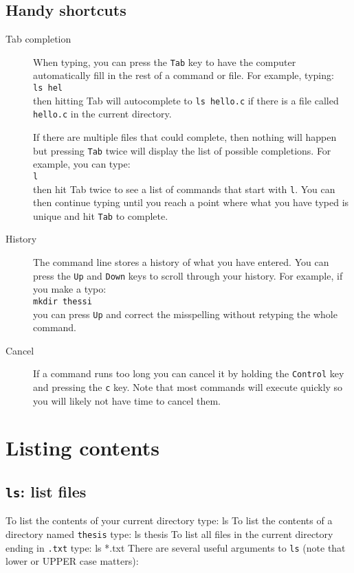 \documentclass[12pt]{article}
\newenvironment{cmd}{\verbatim}{\endverbatim\vspace{5pt}}
\begin{document}
\subsection*{Handy shortcuts}
\begin{description}
\item[Tab completion]
When typing, you can press the \texttt{Tab} key to have the computer automatically fill in the rest of a command or file. For example, typing:\\
\texttt{ls hel}\\
then hitting Tab will autocomplete to \texttt{ls hello.c} if there is a file called \texttt{hello.c} in the current directory. 
 
If there are multiple files that could complete, then nothing will happen but pressing \texttt{Tab} twice will display the list of possible completions. For example, you can type:\\
\texttt{l}\\
then hit Tab twice to see a list of commands that start with \texttt{l}. You can then continue typing until you reach a point where what you have typed is unique and hit \texttt{Tab} to complete.
\item[History]
The command line stores a history of what you have entered. You can press the \texttt{Up} and \texttt{Down} keys to scroll through your history. For example, if you make a typo:\\
\texttt{mkdir thessi}\\
you can press \texttt{Up} and correct the misspelling without retyping the whole command.\
\item[Cancel] If a command runs too long you can cancel it by holding the \texttt{Control} key and pressing the \texttt{c} key. Note that most commands will execute quickly so you will likely not have time to cancel them.

\end{description}


\section*{Listing contents}
\subsection*{\texttt{ls}: list files}
To list the contents of your current directory type:
\begin{cmd}
  ls
\end{cmd}
To list the contents of a directory named \texttt{thesis} type:
\begin{cmd}
  ls thesis
\end{cmd}
To list all files in the current directory ending in \texttt{.txt} type:
\begin{cmd}
  ls *.txt
\end{cmd}
There are several useful arguments to \texttt{ls} (note that lower or UPPER case matters): 
\end{document}
